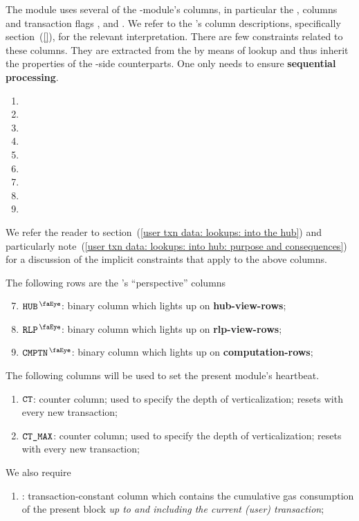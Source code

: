 The \txnDataMod{} module uses several of the \hubMod{}-module's columns, in particular
the \totalTransactionNumber{}, \userTransactionNumber{} columns and transaction flags \sysi{}, \user{} and \sysf{}.
We refer to the \hubMod{}'s column descriptions,
specifically section~(\ref{}),
for the relevant interpretation.
There are few constraints related to these columns.
They are extracted from the \hubMod{} by means of lookup and thus inherit the properties of the \hubMod{}-side counterparts.
One only needs to ensure \textbf{sequential processing}.
\begin{multicols}{3}
	\begin{enumerate}
		\item \blockNumber
		\item \totalTransactionNumber
		\item[\vspace{\fill}]
		\item \sysiTransactionNumber
		\item \userTransactionNumber
		\item \sysfTransactionNumber
		\item \sysi
		\item \user
		\item \sysf
	\end{enumerate}
\end{multicols}
\noindent We refer the reader to
section~(\ref{user txn data: lookups: into the hub}) and particularly
note~(\ref{user txn data: lookups: into hub: purpose and consequences})
for a discussion of the implicit constraints that apply to the above columns.

\noindent The following rows are the \txnDataMod{}'s ``perspective'' columns
\begin{enumerate}\setcounter{enumi}{6}
	\item
		$\isUserTxnHubView$:
		binary column which lights up on \textbf{hub-view-rows};
	\item
		$\isUserTxnRlpView$:
		binary column which lights up on \textbf{rlp-view-rows};
	\item
		$\isUserTxnComputation$:
		binary column which lights up on \textbf{computation-rows};
\end{enumerate}
\noindent The following columns will be used to set the present module's heartbeat.
\begin{enumerate}[resume]
	\item $\texttt{CT}$:
		counter column;
		used to specify the depth of verticalization;
		resets with every new transaction; 
	\item $\texttt{CT\_MAX}$:
		counter column;
		used to specify the depth of verticalization;
		resets with every new transaction; 
\end{enumerate}
We also require
\begin{enumerate}[resume]
	\item \cumulativeConsumedGas:
		transaction-constant column which contains the cumulative gas consumption of the present block
		\emph{up to and including the current (user) transaction};
\end{enumerate}
